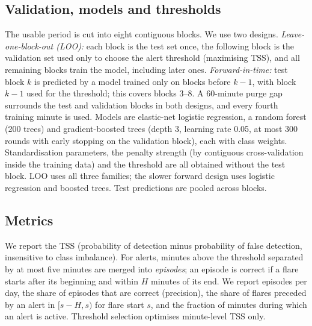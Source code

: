 \documentclass[conference]{IEEEtran}
\begin{document}
\subsection{Validation, models and thresholds}
The usable period is cut into eight contiguous blocks. We use two designs. \emph{Leave-one-block-out (LOO):} each block is the test set once, the following block is the validation set used only to choose the alert threshold (maximising TSS), and all remaining blocks train the model, including later ones. \emph{Forward-in-time:} test block $k$ is predicted by a model trained only on blocks before $k-1$, with block $k-1$ used for the threshold; this covers blocks 3--8. A 60-minute purge gap surrounds the test and validation blocks in both designs, and every fourth training minute is used. Models are elastic-net logistic regression, a random forest (200 trees) and gradient-boosted trees (depth 3, learning rate 0.05, at most 300 rounds with early stopping on the validation block), each with class weights. Standardisation parameters, the penalty strength (by contiguous cross-validation inside the training data) and the threshold are all obtained without the test block. LOO uses all three families; the slower forward design uses logistic regression and boosted trees. Test predictions are pooled across blocks.

\subsection{Metrics}
We report the TSS (probability of detection minus probability of false detection, insensitive to class imbalance). For alerts, minutes above the threshold separated by at most five minutes are merged into \emph{episodes}; an episode is correct if a flare starts after its beginning and within $H$ minutes of its end. We report episodes per day, the share of episodes that are correct (precision), the share of flares preceded by an alert in $[s-H,s)$ for flare start $s$, and the fraction of minutes during which an alert is active. Threshold selection optimises minute-level TSS only.
\end{document}
